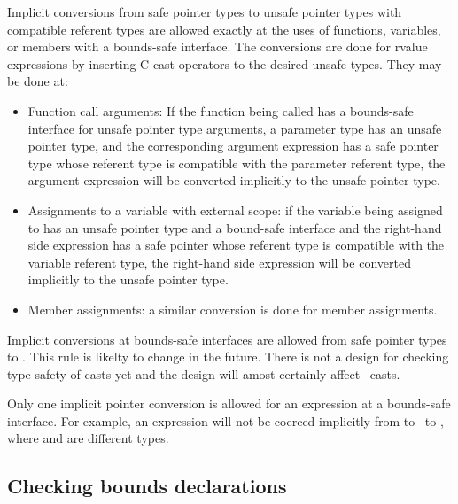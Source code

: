 Implicit conversions from safe pointer types to unsafe pointer types
with compatible referent types are allowed exactly at the uses of functions,
variables, or members with a  bounds-safe interface.  The conversions are done for rvalue expressions by inserting C cast operators to the desired unsafe types.
They may be done at:
\begin{itemize}
\item Function call arguments: If the function being called has a 
      bounds-safe interface for unsafe pointer type arguments, a parameter type 
      has an unsafe pointer type, and the corresponding argument expression has a safe
      pointer type whose referent type is compatible with the parameter
      referent type, the argument expression will be converted implicitly to the 
      unsafe pointer type.
\item Assignments to a variable with external scope: if the variable being
     assigned to has an unsafe pointer type and a bound-safe interface and the
     right-hand side expression has a safe pointer whose referent type is
     compatible with the
     variable referent type, the right-hand side expression will be converted
     implicitly to the unsafe pointer type.
\item
   Member assignments: a similar conversion is done for member assignments.
\end{itemize}

Implicit conversions at bounds-safe interfaces are allowed from safe pointer types to 
\unsafeptrvoid.  This rule is likelty to change in the future.  There is not a  design for
checking type-safety of casts yet and the design will amost certainly affect 
\unsafeptrvoid\ casts.

Only one implicit pointer conversion is allowed for an expression at a bounds-safe
interface.  For example, an expression will not be
coerced implicitly from  to \unsafeptrvoid\ to
, where  and  are different types.


\subsection{Checking bounds declarations}
\label{section:checking-bounds-interfaces}

